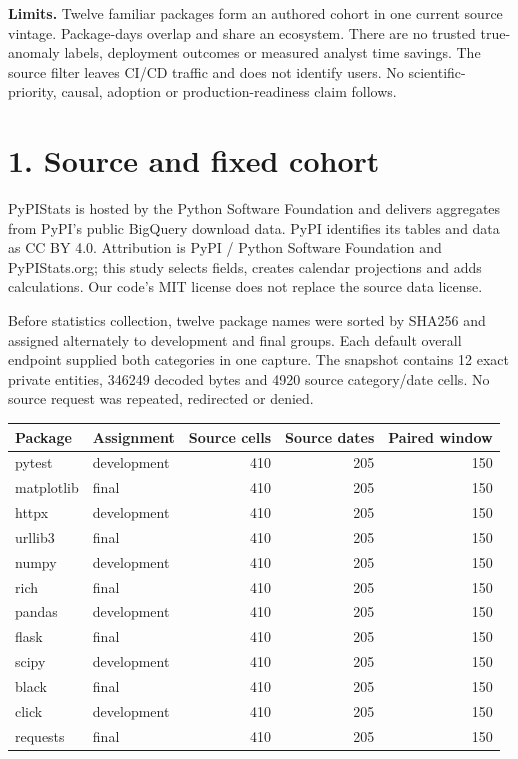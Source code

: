 \documentclass[11pt]{article}
\newcommand{\MSourceFiles}{12}
\newcommand{\MSourceBytes}{346249}
\newcommand{\MSourceCells}{4920}
\newcommand{\MPackageACells}{410}
\newcommand{\MPackageADates}{205}
\newcommand{\MPackageAPaired}{150}
\newcommand{\MPackageBCells}{410}
\newcommand{\MPackageBDates}{205}
\newcommand{\MPackageBPaired}{150}
\newcommand{\MPackageCCells}{410}
\newcommand{\MPackageCDates}{205}
\newcommand{\MPackageCPaired}{150}
\newcommand{\MPackageDCells}{410}
\newcommand{\MPackageDDates}{205}
\newcommand{\MPackageDPaired}{150}
\newcommand{\MPackageECells}{410}
\newcommand{\MPackageEDates}{205}
\newcommand{\MPackageEPaired}{150}
\newcommand{\MPackageFCells}{410}
\newcommand{\MPackageFDates}{205}
\newcommand{\MPackageFPaired}{150}
\newcommand{\MPackageGCells}{410}
\newcommand{\MPackageGDates}{205}
\newcommand{\MPackageGPaired}{150}
\newcommand{\MPackageHCells}{410}
\newcommand{\MPackageHDates}{205}
\newcommand{\MPackageHPaired}{150}
\newcommand{\MPackageICells}{410}
\newcommand{\MPackageIDates}{205}
\newcommand{\MPackageIPaired}{150}
\newcommand{\MPackageJCells}{410}
\newcommand{\MPackageJDates}{205}
\newcommand{\MPackageJPaired}{150}
\newcommand{\MPackageKCells}{410}
\newcommand{\MPackageKDates}{205}
\newcommand{\MPackageKPaired}{150}
\newcommand{\MPackageLCells}{410}
\newcommand{\MPackageLDates}{205}
\newcommand{\MPackageLPaired}{150}
\begin{document}
\textbf{Limits.} Twelve familiar packages form an authored cohort in one current source vintage. Package-days overlap and share an ecosystem. There are no trusted true-anomaly labels, deployment outcomes or measured analyst time savings. The source filter leaves CI/CD traffic and does not identify users. No scientific-priority, causal, adoption or production-readiness claim follows.
\newpage
\section*{1. Source and fixed cohort}
PyPIStats is hosted by the Python Software Foundation and delivers aggregates from PyPI's public BigQuery download data. PyPI identifies its tables and data as CC BY 4.0. Attribution is PyPI / Python Software Foundation and PyPIStats.org; this study selects fields, creates calendar projections and adds calculations. Our code's MIT license does not replace the source data license.

Before statistics collection, twelve package names were sorted by SHA256 and assigned alternately to development and final groups. Each default overall endpoint supplied both categories in one capture. The snapshot contains \MSourceFiles{} exact private entities, \MSourceBytes{} decoded bytes and \MSourceCells{} source category/date cells. No source request was repeated, redirected or denied.

\begin{center}\small\begin{tabular}{llrrr}\toprule
Package & Assignment & Source cells & Source dates & Paired window\\\midrule
pytest & development & \MPackageACells & \MPackageADates & \MPackageAPaired \\
matplotlib & final & \MPackageBCells & \MPackageBDates & \MPackageBPaired \\
httpx & development & \MPackageCCells & \MPackageCDates & \MPackageCPaired \\
urllib3 & final & \MPackageDCells & \MPackageDDates & \MPackageDPaired \\
numpy & development & \MPackageECells & \MPackageEDates & \MPackageEPaired \\
rich & final & \MPackageFCells & \MPackageFDates & \MPackageFPaired \\
pandas & development & \MPackageGCells & \MPackageGDates & \MPackageGPaired \\
flask & final & \MPackageHCells & \MPackageHDates & \MPackageHPaired \\
scipy & development & \MPackageICells & \MPackageIDates & \MPackageIPaired \\
black & final & \MPackageJCells & \MPackageJDates & \MPackageJPaired \\
click & development & \MPackageKCells & \MPackageKDates & \MPackageKPaired \\
requests & final & \MPackageLCells & \MPackageLDates & \MPackageLPaired \\
\bottomrule\end{tabular}\end{center}
\end{document}
